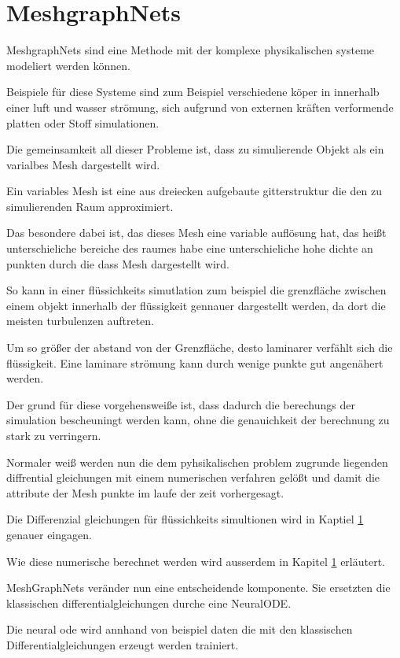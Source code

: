 

\section{MeshgraphNets}

MeshgraphNets sind eine Methode mit der komplexe physikalischen systeme modeliert werden können.

Beispiele für diese Systeme sind zum Beispiel verschiedene köper in innerhalb einer luft und wasser strömung, 
sich aufgrund von externen kräften verformende platten oder Stoff simulationen.


Die gemeinsamkeit all dieser Probleme ist, dass zu simulierende Objekt als ein varialbes Mesh dargestellt wird.

Ein variables Mesh ist eine aus dreiecken aufgebaute gitterstruktur die den zu simulierenden Raum approximiert.

Das besondere dabei ist, das dieses Mesh eine variable auflösung hat, das heißt unterschieliche bereiche des raumes 
habe eine unterschieliche hohe dichte an punkten durch die dass Mesh dargestellt wird.

So kann in einer flüssichkeits simutlation zum beispiel die grenzfläche zwischen einem objekt innerhalb der flüssigkeit
gennauer dargestellt werden, da dort die meisten turbulenzen auftreten.

Um so größer der abstand von der Grenzfläche, desto laminarer verfählt sich die flüssigkeit.
Eine laminare strömung kann durch wenige punkte gut angenähert werden.

Der grund für diese vorgehensweiße ist, dass dadurch die berechungs der simulation bescheuningt werden kann,
ohne die genauichkeit der berechnung zu stark zu verringern.

Normaler weiß werden nun die dem pyhsikalischen problem zugrunde liegenden diffrential gleichungen mit einem numerischen verfahren gelößt und damit die attribute der Mesh punkte im laufe der zeit vorhergesagt.

Die Differenzial gleichungen für flüssichkeits simultionen wird in Kaptiel \ref{} genauer eingagen.

Wie diese numerische berechnet werden wird ausserdem in Kapitel \ref{} erläutert.

MeshGraphNets veränder nun eine entscheidende komponente.
Sie ersetzten die klassischen differentialgleichungen durche eine NeuralODE.

Die neural ode wird annhand von beispiel daten die mit den klassischen Differentialgleichungen erzeugt werden trainiert.

